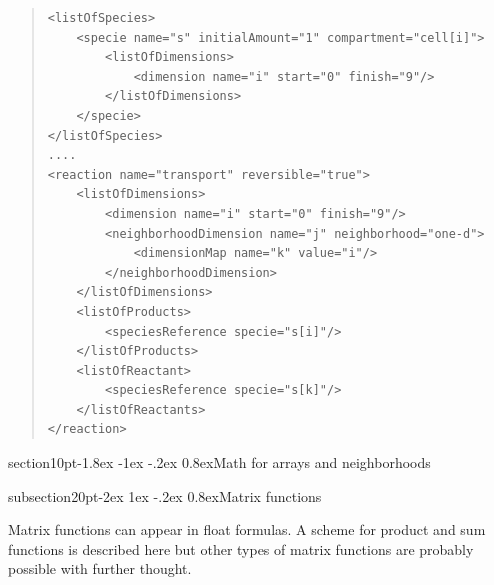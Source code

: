 \documentclass[10pt]{article}
\makeatletter
\renewcommand{\section}{\@startsection%
  {section}{1}{0pt}{-1.8ex \@plus -1ex \@minus -.2ex}%
  {0.8ex}{\normalfont\Large\bfseries\sffamily}}
\renewcommand{\subsection}{\@startsection%
  {subsection}{2}{0pt}{-2ex \@plus 1ex \@minus -.2ex}%
  {0.8ex}{\slshape\large\bfseries\sffamily}}
\newcommand{\tightspacing}{\renewcommand{\baselinestretch}{0.85}}
\newcommand{\regularspacing}{\renewcommand{\baselinestretch}{1.0}}
\makeatother
\begin{document}
\begin{quote}
  \begin{small}
    \tightspacing
\begin{verbatim}
<listOfSpecies>
    <specie name="s" initialAmount="1" compartment="cell[i]">
        <listOfDimensions>
            <dimension name="i" start="0" finish="9"/>
        </listOfDimensions>
    </specie>
</listOfSpecies>
....
<reaction name="transport" reversible="true">
    <listOfDimensions>
        <dimension name="i" start="0" finish="9"/>
        <neighborhoodDimension name="j" neighborhood="one-d">
            <dimensionMap name="k" value="i"/>
        </neighborhoodDimension>
    </listOfDimensions>
    <listOfProducts>
        <speciesReference specie="s[i]"/>
    </listOfProducts>
    <listOfReactant>
        <speciesReference specie="s[k]"/>
    </listOfReactants>
</reaction>

\end{verbatim}
    \regularspacing
  \end{small}
\end{quote}

\section{Math for arrays and neighborhoods}

\subsection{Matrix functions}

Matrix functions can appear in float formulas.  A scheme for product and sum functions is described here but other types of matrix functions
are probably possible with further thought.
\end{document}
